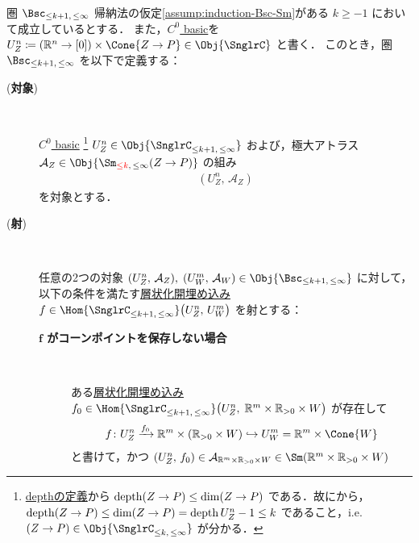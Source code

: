 \documentclass[TQFT_main]{subfiles}
\begin{document}
\begin{mydef}[label=def:Bsc-induction,breakable]{圏 $\Bsc_{\le k+1,\, \le \infty}$}
    帰納法の仮定\ref{assump:induction-Bsc-Sm}がある $k \ge -1$ において成立しているとする．
    また，\hyperref[def:C0-basic]{$C^0$ basic}を $U^n_Z \coloneqq (\mathbb{R}^n \to [0]) \times \Cone{Z \to P} \in \Obj{\SnglrC}$ と書く．
    このとき，圏 $\Bsc_{\le k+1,\, \le \infty}$ を以下で定義する：
    \begin{description}
        \item[(\textbf{対象})]　
        
        \hyperref[def:C0-basic]{$C^0$ basic}
        \footnote{\hyperref[def:dim-depth]{depthの定義}から $\operatorname{depth} (Z \to P) \le \dim (Z \to P)$ である．故にから，$\operatorname{depth} (Z \to P) \le \dim (Z \to P) = \operatorname{depth} U^n_Z - 1 \le k$ であること，i.e. $(Z \to P) \in \Obj{\SnglrC_{\le k,\, \le \infty}}$ が分かる．} $U^n_Z \in \Obj{\SnglrC_{\le k+1,\, \le \infty}}$ および，極大アトラス $\mathcal{A}_Z \in \Obj{\Sm_{\textcolor{red}{\le k},\, \le \infty} (Z \to P)}$ の組み
        \begin{align}
            (U^n_Z,\, \mathcal{A}_Z)
        \end{align}
        を対象とする．

        \item[(\textbf{射})]　
        
        任意の2つの対象 $(U^n_Z,\, \mathcal{A}_Z),\; (U^m_W,\, \mathcal{A}_W) \in \Obj{\Bsc_{\le k+1,\, \le \infty}}$ に対して，以下の条件を満たす\hyperref[def:strat-emb]{層状化開埋め込み} $f \in \Hom{\SnglrC_{\le k+1,\, \le \infty}} \bigl(U^n_Z,\, U^m_W \bigr)$ を射とする：
        \begin{description}
            \item[\textbf{$\bm{f}$ がコーンポイントを保存しない場合}]　  
            
            ある\hyperref[def:strat-emb]{層状化開埋め込み} $f_0 \in \Hom{\SnglrC_{\le k+1,\, \le \infty}} \bigl(U^n_Z,\; \mathbb{R}^m \times \mathbb{R}_{> 0} \times W\bigr)$ が存在して
            \begin{align}
                f \colon U^n_Z \xrightarrow{f_0} \mathbb{R}^m \times (\mathbb{R}_{> 0} \times W) \hookrightarrow U^m_W = \mathbb{R}^m \times \Cone{W}
            \end{align}
            と書けて，かつ $(U^n_Z,\, f_0) \in \mathcal{A}_{\mathbb{R}^m \times \mathbb{R}_{> 0} \times W} \in \Sm(\mathbb{R}^m \times \mathbb{R}_{> 0} \times W)$
            

\end{description}
\end{description}
\end{mydef}
\end{document}
